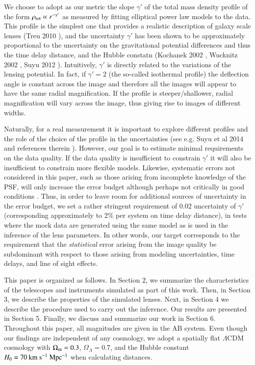 \documentclass[a4paper,11pt]{article}
\begin{document}
We choose to adopt as our metric the slope $\gamma'$ of the total mass
density profile of the form $\rho_{\rm tot}\propto r^{-\gamma'}$ as
measured by fitting elliptical power law models to the data. This
profile is the simplest one that provides a realistic description of
galaxy scale lenses (Treu 2010 \citep{2010ARA&A..48...87T}), and the
uncertainty $\gamma'$ has been shown to be approximately proportional
to the uncertainty on the gravitational potential differences and thus
the time delay distance, and the Hubble constatn (Kochanek 2002
\citep{2002ApJ...578...25K}, Wucknitz 2002
\citep{2002MNRAS.332..951W}, Suyu 2012
\citep{2012MNRAS.426..868S}).  Intuitively, $\gamma'$ is directly
related to the variations of the lensing potential. In fact, if
$\gamma'=2$ (the so-called isothermal profile) the deflection angle is
constant across the image and therefore all the images will appear to
have the same radial magnification. If the profile is
steeper/shallower, radial magnification will vary across the image,
thus giving rise to images of different widths.

Naturally, for a real measurement it is important to explore different
profiles and the role of the choice of the profile in the
uncertainties (see e.g. Suyu et al 2014 and references therein
\cite{2014ApJ...788L..35S}). However, our goal is to estimate minimal
requirements on the data quality. If the data quality is insufficient
to constrain $\gamma'$ it will also be insufficient to constrain more
flexible models. Likewise, systematic errors not considered in this
paper, such as those arising from incomplete knowledge of the PSF,
will only increase the error budget
\citep[e.g.,][]{2015arXiv150602720A} although perhaps not critically
in good conditions
\citep[e.g.,][]{2007ApJ...671.1196M,2012MNRAS.424.2800L}. Thus, in
order to leave room for additional sources of uncertainty in the error
budget, we set a rather stringent requirement of 0.02 uncertainty of
$\gamma'$ (corresponding approximately to 2\% per system on time delay
distance), in tests where the mock data are generated using the same
model as is used in the inference of the lens parameters. In other
words, our target corresponds to the requirement that the {\it
statistical} error arising from the image quality be subdominant with
respect to those arising from modeling uncertainties, time delays, and
line of sight effects.

This paper is organized as follows. In Section 2, we summarize the
characteristics of the telescopes and instruments simulated as part of
this work. Then, in Section 3, we describe the properties of the
simulated lenses. Next, in Section 4 we describe the procedure used to
carry out the inference.  Our results are presented in Section
5. Finally, we discuss and summarize our work in Section 6. Throughout
this paper, all magnitudes are given in the AB system. Even though our
findings are independent of any cosmology, we adopt a spatially flat
$\Lambda$CDM cosmology with $\Omega_{\rm{m}} = 0.3$, $\Omega_{\Lambda}
= 0.7$, and the Hubble constant $H_{0} = 70~\rm km~s^{-1}~Mpc^{-1}$
when calculating distances.
\end{document}

